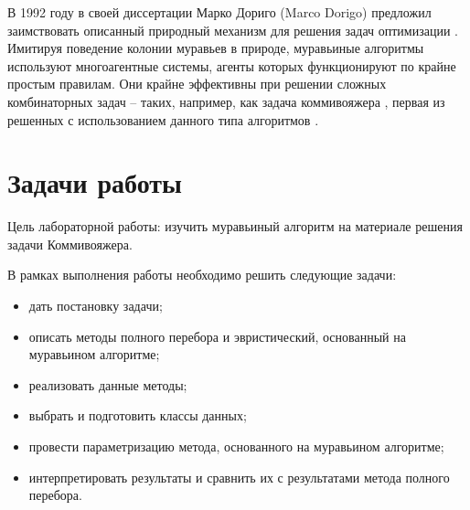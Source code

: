 В 1992 году в своей диссертации Марко Дориго (Marco Dorigo) предложил заимствовать описанный природный механизм для решения задач оптимизации \cite{Dorigo}.
Имитируя поведение колонии муравьев в природе, муравьиные алгоритмы используют многоагентные системы, агенты которых функционируют по крайне простым правилам.
Они крайне эффективны при решении сложных комбинаторных задач – таких, например, как задача коммивояжера \cite{TSPr}, первая из решенных с использованием данного типа алгоритмов \cite{Mueller}.

\section*{Задачи работы}

Цель лабораторной работы: изучить муравьиный алгоритм на материале решения задачи Коммивояжера.

В рамках выполнения работы необходимо решить следующие задачи:
\begin{itemize}
	\item дать постановку задачи;
	\item описать методы полного перебора и эвристический, основанный на муравьином алгоритме;
	\item реализовать данные методы;
	\item выбрать и подготовить классы данных;
	\item провести параметризацию метода, основанного на муравьином алгоритме;
	\item интерпретировать результаты и сравнить их с результатами метода полного перебора.
\end{itemize}
